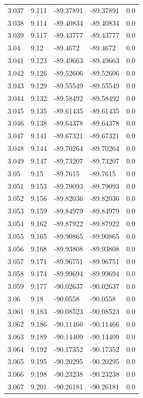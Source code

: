 \begin{tabular}{lllll}
3.037 & 9.111 & -89.37891 & -89.37891 & 0.0 \\
3.038 & 9.114 & -89.40834 & -89.40834 & 0.0 \\
3.039 & 9.117 & -89.43777 & -89.43777 & 0.0 \\
3.04 & 9.12 & -89.4672 & -89.4672 & 0.0 \\
3.041 & 9.123 & -89.49663 & -89.49663 & 0.0 \\
3.042 & 9.126 & -89.52606 & -89.52606 & 0.0 \\
3.043 & 9.129 & -89.55549 & -89.55549 & 0.0 \\
3.044 & 9.132 & -89.58492 & -89.58492 & 0.0 \\
3.045 & 9.135 & -89.61435 & -89.61435 & 0.0 \\
3.046 & 9.138 & -89.64378 & -89.64378 & 0.0 \\
3.047 & 9.141 & -89.67321 & -89.67321 & 0.0 \\
3.048 & 9.144 & -89.70264 & -89.70264 & 0.0 \\
3.049 & 9.147 & -89.73207 & -89.73207 & 0.0 \\
3.05 & 9.15 & -89.7615 & -89.7615 & 0.0 \\
3.051 & 9.153 & -89.79093 & -89.79093 & 0.0 \\
3.052 & 9.156 & -89.82036 & -89.82036 & 0.0 \\
3.053 & 9.159 & -89.84979 & -89.84979 & 0.0 \\
3.054 & 9.162 & -89.87922 & -89.87922 & 0.0 \\
3.055 & 9.165 & -89.90865 & -89.90865 & 0.0 \\
3.056 & 9.168 & -89.93808 & -89.93808 & 0.0 \\
3.057 & 9.171 & -89.96751 & -89.96751 & 0.0 \\
3.058 & 9.174 & -89.99694 & -89.99694 & 0.0 \\
3.059 & 9.177 & -90.02637 & -90.02637 & 0.0 \\
3.06 & 9.18 & -90.0558 & -90.0558 & 0.0 \\
3.061 & 9.183 & -90.08523 & -90.08523 & 0.0 \\
3.062 & 9.186 & -90.11466 & -90.11466 & 0.0 \\
3.063 & 9.189 & -90.14409 & -90.14409 & 0.0 \\
3.064 & 9.192 & -90.17352 & -90.17352 & 0.0 \\
3.065 & 9.195 & -90.20295 & -90.20295 & 0.0 \\
3.066 & 9.198 & -90.23238 & -90.23238 & 0.0 \\
3.067 & 9.201 & -90.26181 & -90.26181 & 0.0 \\

\end{tabular}
